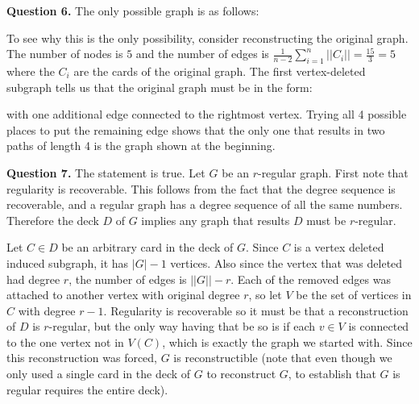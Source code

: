 \documentclass[letterpaper, reqno,11pt]{article}
\begin{document}
{\medskip\noindent\bf Question 6.} The only possible graph is as follows:

\begin{center}
\end{center}

To see why this is the only possibility, consider reconstructing the original graph. The number of nodes is $5$ and the number of edges is $\frac{1}{n-2}\sum_{i=1}^{n}| |C_i| |=\frac{15}{3}=5$ where the $C_i$ are the cards of the original graph. The first vertex-deleted subgraph tells us that the original graph must be in the form: 

\begin{center}
\end{center}
with one additional edge connected to the rightmost vertex. Trying all 4 possible places to put the remaining edge shows that the only one that results in two paths of length 4 is the graph shown at the beginning. 

{\medskip\noindent\bf Question 7.} The statement is true. Let $G$ be an $r$-regular graph. First note that regularity is recoverable. This follows from the fact that the degree sequence is recoverable, and a regular graph has a degree sequence of all the same numbers. Therefore the deck $D$ of $G$ implies any graph that results $D$ must be $r$-regular. 

Let $C\in D$ be an arbitrary card in the deck of $G$. Since $C$ is a vertex deleted induced subgraph, it has $|G|-1$ vertices. Also since the vertex that was deleted had degree $r$, the number of edges is $| |G| |-r$. Each of the removed edges was attached to another vertex with original degree $r$, so let $V$ be the set of vertices in $C$ with degree $r-1$. Regularity is recoverable so it must be that a reconstruction of $D$ is $r$-regular, but the only way having that be so is if each $v\in V$ is connected to the one vertex not in $V(C)$, which is exactly the graph we started with. Since this reconstruction was forced, $G$ is reconstructible (note that even though we only used a single card in the deck of $G$ to reconstruct $G$, to establish that $G$ is regular requires the entire deck). 
\end{document}
